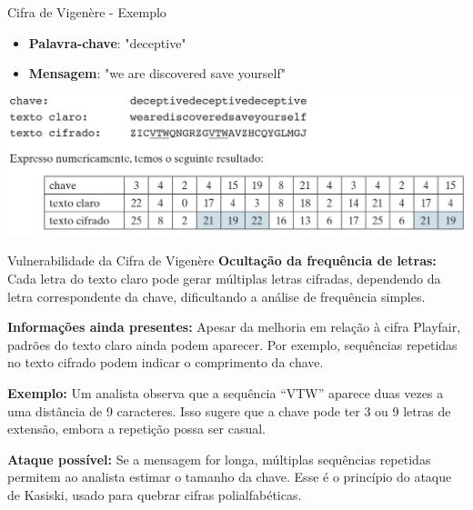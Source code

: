 \begin{frame}{Cifra de Vigenère - Exemplo}
    \begin{itemize}
        \item \textbf{Palavra-chave}: "deceptive"
        \item \textbf{Mensagem}: "we are discovered save yourself"
    \end{itemize}
    \vspace{0.5cm}
    \centering
    \includegraphics[width=\linewidth]{Figuras/Exemplo-Cifra-de-Vigenere.png}



\end{frame}

\begin{frame}{Vulnerabilidade da Cifra de Vigenère}
    \textbf{Ocultação da frequência de letras:}
    Cada letra do texto claro pode gerar múltiplas letras cifradas, dependendo da letra correspondente da chave, dificultando a análise de frequência simples.

    \medskip
    \textbf{Informações ainda presentes:}
    Apesar da melhoria em relação à cifra Playfair, padrões do texto claro ainda podem aparecer. Por exemplo, sequências repetidas no texto cifrado podem indicar o comprimento da chave.

    \medskip
    \textbf{Exemplo:}
    Um analista observa que a sequência ``VTW'' aparece duas vezes a uma distância de 9 caracteres.
    Isso sugere que a chave pode ter 3 ou 9 letras de extensão, embora a repetição possa ser casual.

    \medskip
    \textbf{Ataque possível:}
    Se a mensagem for longa, múltiplas sequências repetidas permitem ao analista estimar o tamanho da chave.
    Esse é o princípio do ataque de Kasiski, usado para quebrar cifras polialfabéticas.
\end{frame}

